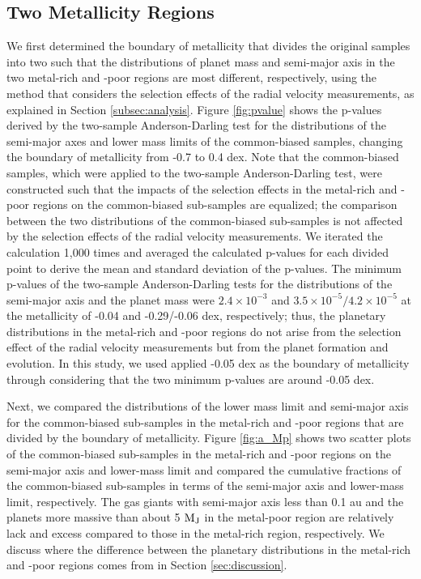 \documentclass[twocolumn, dvipdfmx]{aastex62}
\begin{document}
\begin{CJK*}{UTF8}{min}
\subsection{Two Metallicity Regions} \label{subsec:metal}

We first determined the boundary of metallicity that divides the original samples into two such that the distributions of planet mass and semi-major axis in the two metal-rich and -poor regions are most different, respectively, using the method that considers the selection effects of the radial velocity measurements, as explained in Section \ref{subsec:analysis}. Figure \ref{fig:pvalue} shows the p-values derived by the two-sample Anderson-Darling test for the distributions of the semi-major axes and lower mass limits of the common-biased samples, changing the boundary of metallicity from -0.7 to 0.4 dex. Note that the common-biased samples, which were applied to the two-sample Anderson-Darling test, were constructed such that the impacts of the selection effects in the metal-rich and -poor regions on the common-biased sub-samples are equalized; the comparison between the two distributions of the common-biased sub-samples is not affected by the selection effects of the radial velocity measurements. We iterated the calculation 1,000 times and averaged the calculated p-values for each divided point to derive the mean and standard deviation of the p-values. The minimum p-values of the two-sample Anderson-Darling tests for the distributions of the semi-major axis and the planet mass were $2.4\times10^{-3}$ and $3.5\times10^{-5}/4.2\times10^{-5}$ at the metallicity of -0.04 and -0.29/-0.06 dex, respectively; thus, the planetary distributions in the metal-rich and -poor regions do not arise from the selection effect of the radial velocity measurements but from the planet formation and evolution. In this study, we used applied -0.05 dex as the boundary of metallicity through considering that the two minimum p-values are around -0.05 dex.

Next, we compared the distributions of the lower mass limit and semi-major axis for the common-biased sub-samples in the metal-rich and -poor regions that are divided by the boundary of metallicity. Figure \ref{fig:a_Mp} shows two scatter plots of the common-biased sub-samples in the metal-rich and -poor regions on the semi-major axis and lower-mass limit and compared the cumulative fractions of the common-biased sub-samples in terms of the semi-major axis and lower-mass limit, respectively. The gas giants with semi-major axis less than 0.1 au and the planets more massive than about 5 $\rm M_J$ in the metal-poor region are relatively lack and excess compared to those in the metal-rich region, respectively. We discuss where the difference between the planetary distributions in the metal-rich and -poor regions comes from in Section \ref{sec:discussion}.


\end{CJK*}
\end{document}
